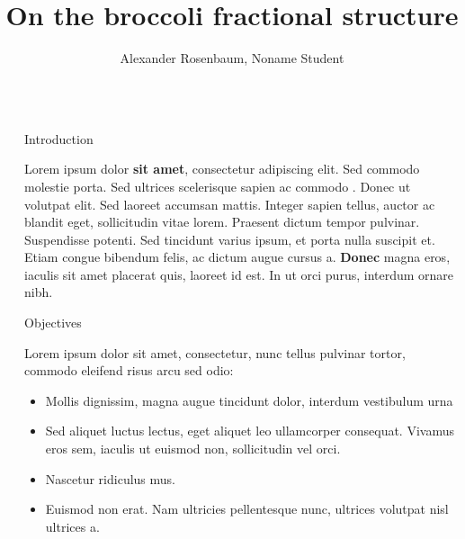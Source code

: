 \documentclass[]{beamer}
\title{On the broccoli fractional structure}
\author{Alexander Rosenbaum, Noname Student}
\begin{document}
\nocite{*} %

\begin{frame}[t]
    \begin{columns}[t] %
     
    \begin{column}{\sepwid}\end{column} %
    
    \begin{column}{\onecolwid} %
     
    
    \begin{block}{Introduction}
    
    Lorem ipsum dolor \textbf{sit amet}, consectetur adipiscing elit. Sed commodo molestie porta. Sed ultrices scelerisque sapien ac commodo \cite{Black1976}. Donec ut volutpat elit. Sed laoreet accumsan mattis. Integer sapien tellus, auctor ac blandit eget, sollicitudin vitae lorem. Praesent dictum tempor pulvinar. Suspendisse potenti. Sed tincidunt varius ipsum, et porta nulla suscipit et. Etiam congue bibendum felis, ac dictum augue cursus a. \textbf{Donec} magna eros, iaculis sit amet placerat quis, laoreet id est. In ut orci purus, interdum ornare nibh. 
    
    \end{block}
    
    
    \begin{alertblock}{Objectives}
    
    Lorem ipsum dolor sit amet, consectetur, nunc tellus pulvinar tortor, commodo eleifend risus arcu sed odio:
    \begin{itemize}
    \item Mollis dignissim, magna augue tincidunt dolor, interdum vestibulum urna
    \item Sed aliquet luctus lectus, eget aliquet leo ullamcorper consequat. Vivamus eros sem, iaculis ut euismod non, sollicitudin vel orci.
    \item Nascetur ridiculus mus.  
    \item Euismod non erat. Nam ultricies pellentesque nunc, ultrices volutpat nisl ultrices a.
    \end{itemize}
    

\end{alertblock}
\end{column}
\end{columns}
\end{frame}
\end{document}
